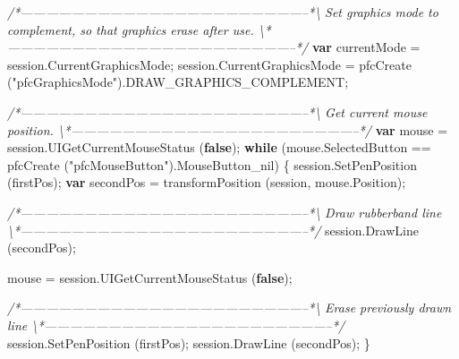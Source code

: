 \documentclass[]{article}
\newenvironment{Shaded}{}{}
\newcommand{\KeywordTok}[1]{\textcolor[rgb]{0.00,0.44,0.13}{\textbf{{#1}}}}
\newcommand{\StringTok}[1]{\textcolor[rgb]{0.25,0.44,0.63}{{#1}}}
\newcommand{\CommentTok}[1]{\textcolor[rgb]{0.38,0.63,0.69}{\textit{{#1}}}}
\newcommand{\OtherTok}[1]{\textcolor[rgb]{0.00,0.44,0.13}{{#1}}}
\newcommand{\FunctionTok}[1]{\textcolor[rgb]{0.02,0.16,0.49}{{#1}}}
\newcommand{\NormalTok}[1]{{#1}}
\begin{document}
\begin{Shaded}
\begin{Highlighting}[]
\CommentTok{/*--------------------------------------------------------------------*\textbackslash{} }
\CommentTok{  Set graphics mode to complement, so that graphics erase after use. }
\CommentTok{\textbackslash{}*--------------------------------------------------------------------*/} 
  \KeywordTok{var} \NormalTok{currentMode = }\OtherTok{session}\NormalTok{.}\FunctionTok{CurrentGraphicsMode}\NormalTok{;}
  \OtherTok{session}\NormalTok{.}\FunctionTok{CurrentGraphicsMode} \NormalTok{= }\FunctionTok{pfcCreate} \NormalTok{(}\StringTok{"pfcGraphicsMode"}\NormalTok{).}\FunctionTok{DRAW_GRAPHICS_COMPLEMENT}\NormalTok{;}
  
\CommentTok{/*--------------------------------------------------------------------*\textbackslash{} }
\CommentTok{  Get current mouse position.}
\CommentTok{\textbackslash{}*--------------------------------------------------------------------*/} 
  \KeywordTok{var} \NormalTok{mouse = }\OtherTok{session}\NormalTok{.}\FunctionTok{UIGetCurrentMouseStatus} \NormalTok{(}\KeywordTok{false}\NormalTok{);}
  \KeywordTok{while} \NormalTok{(}\OtherTok{mouse}\NormalTok{.}\FunctionTok{SelectedButton} \NormalTok{== }\FunctionTok{pfcCreate} \NormalTok{(}\StringTok{"pfcMouseButton"}\NormalTok{).}\FunctionTok{MouseButton_nil}\NormalTok{)}
    \NormalTok{\{  }
      \OtherTok{session}\NormalTok{.}\FunctionTok{SetPenPosition} \NormalTok{(firstPos);}
      \KeywordTok{var} \NormalTok{secondPos = }\FunctionTok{transformPosition} \NormalTok{(session, }\OtherTok{mouse}\NormalTok{.}\FunctionTok{Position}\NormalTok{);}

\CommentTok{/*--------------------------------------------------------------------*\textbackslash{} }
\CommentTok{  Draw rubberband line }
\CommentTok{\textbackslash{}*--------------------------------------------------------------------*/} 
      \OtherTok{session}\NormalTok{.}\FunctionTok{DrawLine} \NormalTok{(secondPos);}
      
      \NormalTok{mouse = }\OtherTok{session}\NormalTok{.}\FunctionTok{UIGetCurrentMouseStatus} \NormalTok{(}\KeywordTok{false}\NormalTok{);}
      
\CommentTok{/*--------------------------------------------------------------------*\textbackslash{} }
\CommentTok{  Erase previously drawn line}
\CommentTok{\textbackslash{}*--------------------------------------------------------------------*/} 
      \OtherTok{session}\NormalTok{.}\FunctionTok{SetPenPosition} \NormalTok{(firstPos);}
      \OtherTok{session}\NormalTok{.}\FunctionTok{DrawLine} \NormalTok{(secondPos);    }
    \NormalTok{\}}
  

\end{Highlighting}
\end{Shaded}
\end{document}
